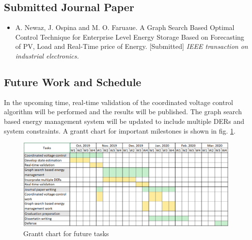 \subsection{Submitted Journal Paper}
\begin{itemize}
    \item A. Newaz, J. Ospina and M. O. Faruaue. A Graph Search Based Optimal Control Technique for Enterprise Level Energy Storage Based on Forecasting of PV, Load and Real-Time price of Energy. [Submitted] \textit{IEEE transaction on industrial electronics.}

\end{itemize}

\subsection{Future Work and Schedule}
In the upcoming time, real-time validation of the coordinated voltage control algorithm will be performed and the results will be published. The graph search based energy management system will be updated to include multiple DERs and system constraints. A grantt chart for important milestones is shown in fig. \ref{fig:GANTT}.

\begin{figure}[!ht]
    \centering
    \includegraphics[width = \linewidth]{figs/Gantt2.png}
    \caption{Grantt chart for future tasks}
    \label{fig:GANTT}
\end{figure}
